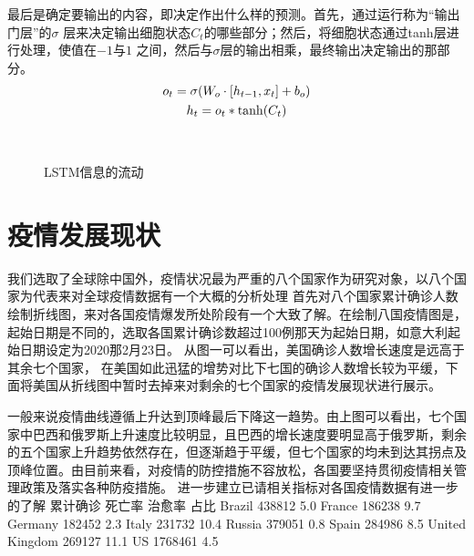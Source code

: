 \documentclass[lang=cn,11pt,a4paper,cite=authoryear]{elegantpaper}
\begin{document}
最后是确定要输出的内容，即决定作出什么样的预测。首先，通过运行称为“输出门层”的$\sigma$
层来决定输出细胞状态$C_t$的哪些部分；然后，将细胞状态通过tanh层进行处理，使值在$-1$与$1$
之间，然后与$\sigma$层的输出相乘，最终输出决定输出的那部分。
\begin{gather}
o_t=\sigma(W_o \cdot [h_{t-1},x_t]+b_o) \\
h_t=o_t*{\rm tanh}(C_t)
\end{gather}

\begin{figure}[htp]
	\centering
	\\
    \caption{LSTM信息的流动}
	\label{fig:LSTM}
\end{figure}

\section{疫情发展现状}

我们选取了全球除中国外，疫情状况最为严重的八个国家作为研究对象，以八个国家为代表来对全球疫情数据有一个大概的分析处理
首先对八个国家累计确诊人数绘制折线图，来对各国疫情爆发所处阶段有一个大致了解。在绘制八国疫情图是，起始日期是不同的，选取各国累计确诊数超过100例那天为起始日期，如意大利起始日期设定为2020那2月23日。   
从图一可以看出，美国确诊人数增长速度是远高于其余七个国家， 在美国如此迅猛的增势对比下七国的确诊人数增长较为平缓，下面将美国从折线图中暂时去掉来对剩余的七个国家的疫情发展现状进行展示。

一般来说疫情曲线遵循上升达到顶峰最后下降这一趋势。由上图可以看出，七个国家中巴西和俄罗斯上升速度比较明显，且巴西的增长速度要明显高于俄罗斯，剩余的五个国家上升趋势依然存在，但逐渐趋于平缓，但七个国家的均未到达其拐点及顶峰位置。由目前来看，对疫情的防控措施不容放松，各国要坚持贯彻疫情相关管理政策及落实各种防疫措施。
进一步建立已请相关指标对各国疫情数据有进一步的了解
	累计确诊	死亡率	治愈率	占比
Brazil	438812	5.0%
France	186238	9.7%
Germany	182452	2.3%
Italy	231732	10.4%
Russia	379051	0.8%
Spain	284986	8.5%
United Kingdom	269127	11.1%
US	1768461	4.5%
\end{document}
